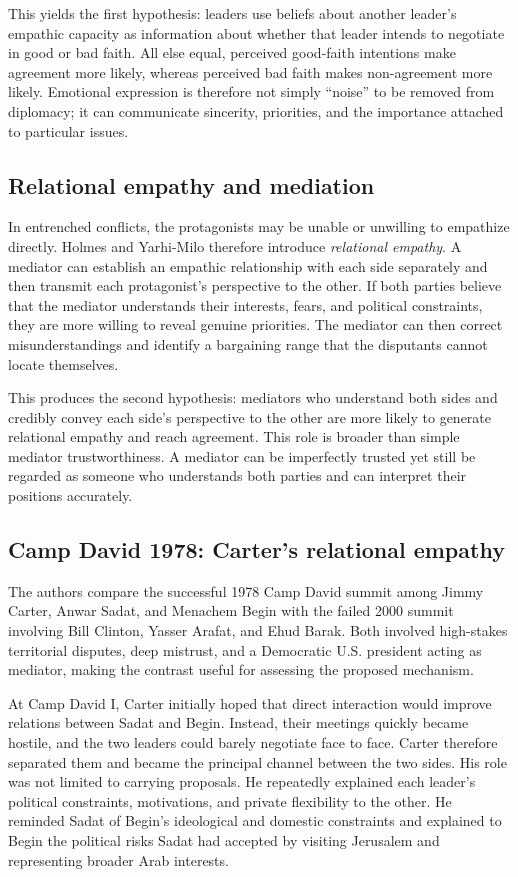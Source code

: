 This yields the first hypothesis: leaders use beliefs about another leader's empathic capacity as information about whether that leader intends to negotiate in good or bad faith. All else equal, perceived good-faith intentions make agreement more likely, whereas perceived bad faith makes non-agreement more likely. Emotional expression is therefore not simply ``noise'' to be removed from diplomacy; it can communicate sincerity, priorities, and the importance attached to particular issues.

\subsection{Relational empathy and mediation}

In entrenched conflicts, the protagonists may be unable or unwilling to empathize directly. Holmes and Yarhi-Milo therefore introduce \emph{relational empathy}. A mediator can establish an empathic relationship with each side separately and then transmit each protagonist's perspective to the other. If both parties believe that the mediator understands their interests, fears, and political constraints, they are more willing to reveal genuine priorities. The mediator can then correct misunderstandings and identify a bargaining range that the disputants cannot locate themselves.

This produces the second hypothesis: mediators who understand both sides and credibly convey each side's perspective to the other are more likely to generate relational empathy and reach agreement. This role is broader than simple mediator trustworthiness. A mediator can be imperfectly trusted yet still be regarded as someone who understands both parties and can interpret their positions accurately.

\subsection{Camp David 1978: Carter's relational empathy}

The authors compare the successful 1978 Camp David summit among Jimmy Carter, Anwar Sadat, and Menachem Begin with the failed 2000 summit involving Bill Clinton, Yasser Arafat, and Ehud Barak. Both involved high-stakes territorial disputes, deep mistrust, and a Democratic U.S. president acting as mediator, making the contrast useful for assessing the proposed mechanism.

At Camp David I, Carter initially hoped that direct interaction would improve relations between Sadat and Begin. Instead, their meetings quickly became hostile, and the two leaders could barely negotiate face to face. Carter therefore separated them and became the principal channel between the two sides. His role was not limited to carrying proposals. He repeatedly explained each leader's political constraints, motivations, and private flexibility to the other. He reminded Sadat of Begin's ideological and domestic constraints and explained to Begin the political risks Sadat had accepted by visiting Jerusalem and representing broader Arab interests.

